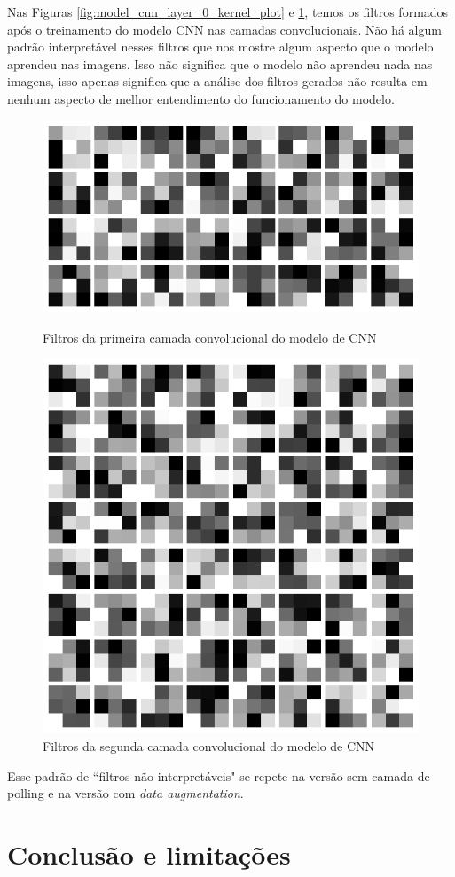 \documentclass[12pt]{article}
\begin{document}
Nas Figuras \ref{fig:model_cnn_layer_0_kernel_plot} e \ref{fig:model_cnn_layer_1_kernel_plot}, temos os filtros formados após o treinamento do modelo CNN nas camadas convolucionais. Não há algum padrão interpretável nesses filtros que nos mostre algum aspecto que o modelo aprendeu nas imagens. Isso não significa que o modelo não aprendeu nada nas imagens, isso apenas significa que a análise dos filtros gerados não resulta em nenhum aspecto de melhor entendimento do funcionamento do modelo.  


\begin{figure}[H]
  \centering
  \begin{minipage}{0.5\textwidth}
    \centering
    \includegraphics[width=.5\textwidth]{../images/kernels_plt/model_cnn_layer_0_kernel_plot.png}
    \caption{Filtros da primeira camada convolucional do modelo de CNN}
    \label{fig:model_cnn_layer_0_kernel_plot}
  \end{minipage}%
  \hfill
  \begin{minipage}{0.5\textwidth}
    \centering
    \includegraphics[width=.5\textwidth]{../images/kernels_plt/model_cnn_layer_1_kernel_plot.png}
    \caption{Filtros da segunda camada convolucional do modelo de CNN}
    \label{fig:model_cnn_layer_1_kernel_plot}
  \end{minipage}
  \end{figure}

  Esse padrão de ``filtros não interpretáveis" se repete  na versão sem camada de polling e na versão com \textit{data augmentation}.




\section{Conclusão e limitações}



\end{document}
